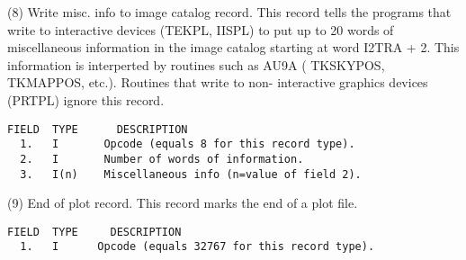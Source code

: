 (8)  Write misc. info to image catalog record.
     This record tells the programs that write to interactive
devices (TEKPL, IISPL) to put up to 20 words of miscellaneous
information in the image catalog starting at word I2TRA + 2.
This information is interperted by routines such as AU9A
( TKSKYPOS, TKMAPPOS, etc.).  Routines that write to non-
interactive graphics devices (PRTPL) ignore this record.
 
\begin{verbatim}
FIELD  TYPE      DESCRIPTION
  1.   I       Opcode (equals 8 for this record type).
  2.   I       Number of words of information.
  3.   I(n)    Miscellaneous info (n=value of field 2).
\end{verbatim}

 
 
(9)  End of plot record.
    This record marks the end of a plot file.
 
\begin{verbatim}
FIELD  TYPE     DESCRIPTION
  1.   I      Opcode (equals 32767 for this record type).
\end{verbatim}


